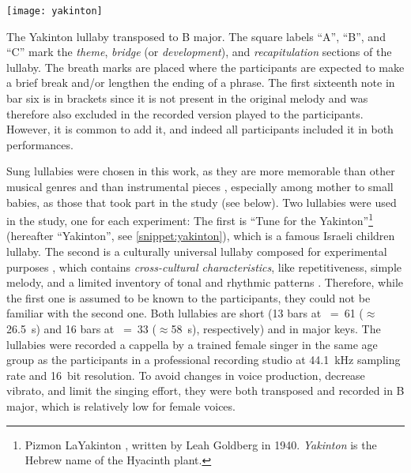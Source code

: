 \begin{snippet}[t]
	\centering
	\texttt{[image: yakinton]}
	\caption[Yakinton lullaby]
		{The Yakinton lullaby transposed to B major.
		The square labels \enquote{A}, \enquote{B}, and \enquote{C} mark the \emph{theme}, \emph{bridge} (or \emph{development}), and \emph{recapitulation} sections of the lullaby.
		The breath marks are placed where the participants are expected to make a brief break and/or lengthen the ending of a phrase.
		The first sixteenth note in bar six is in brackets since it is not present in the original melody and was therefore also excluded in the recorded version played to the participants.
		However, it is common to add it, and indeed all participants included it in both performances.}
	\label{snippet:yakinton}
\end{snippet}
%
Sung lullabies were chosen in this work, as they are more memorable than other musical genres and than instrumental pieces \citep{Weiss2012something, Trehub1991music}, especially among mother to small babies, as those that took part in the study (see below).
Two lullabies were used in the study, one for each experiment: The first is \enquote{Tune for the Yakinton}\footnote{Pizmon LaYakinton
, written by Leah Goldberg in 1940. \emph{Yakinton} is the Hebrew name of the Hyacinth plant.} (hereafter \enquote{Yakinton}, see \cref{snippet:yakinton}), which is a famous Israeli children lullaby.
The second is a culturally universal lullaby composed for experimental purposes \citep[][pp.~22-47, and see \cref{snippet:uni-lullaby}]{Twig2016universal}, which contains \emph{cross-cultural characteristics}, like repetitiveness, simple melody, and a limited inventory of tonal and rhythmic patterns \citep{Unyk1992lullabies, Trehub1993maternal}.
Therefore, while the first one is assumed to be known to the participants, they could not be familiar with the second one.
Both lullabies are short (13 bars at \musQuarter~=~61 ($\approx$\SI{26.5}{\second}) and 16 bars at \musQuarterDotted~=~33 ($\approx$\SI{58}{\second}), respectively) and in major keys.
The lullabies were recorded a cappella by a trained female singer in the same age group as the participants in a professional recording studio at \SI{44.1}{\kilo\hertz} sampling rate and 16~bit resolution.
To avoid changes in voice production, decrease vibrato, and limit the singing effort, they were both transposed and recorded in B major, which is relatively low for female voices.
